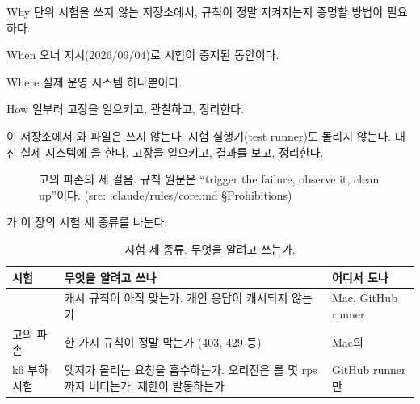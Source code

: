 \begin{inbrief}
  \item[Why] 단위 시험을 쓰지 않는 저장소에서, 규칙이 정말 지켜지는지 증명할 방법이 필요하다.
  \item[When] 오너 지시(2026/09/04)로 시험이 중지된 동안이다.
  \item[Where] 실제 운영 시스템 하나뿐이다.
  \item[How] 일부러 고장을 일으키고, 관찰하고, 정리한다.
\end{inbrief}

이 저장소에서 와  파일은 쓰지 않는다.
시험 실행기(test runner)도 돌리지 않는다.
대신 실제 시스템에 을 한다.
고장을 일으키고, 결과를 보고, 정리한다.

\begin{figure}[H]
  \centering
  \caption{고의 파손의 세 걸음. 규칙 원문은 ``trigger the failure, observe it, clean up''이다.
  (src: .claude/rules/core.md §Prohibitions)}\label{fig:07-breakage-steps}
\end{figure}

가 이 장의 시험 세 종류를 나눈다.

\begin{table}[H]
  \caption{시험 세 종류. 무엇을 알려고 쓰는가.}\label{tab:07-test-kinds}
  \small
  \begin{tabularx}{\linewidth}{L{3.6cm} Y L{3.4cm}}
    \toprule
    시험 & 무엇을 알려고 쓰나 & 어디서 도나 \\
    \midrule
     & 캐시 규칙이 아직 맞는가. 개인 응답이 캐시되지 않는가 & Mac, GitHub runner \\
    \midrule
    고의 파손 & 한 가지 규칙이 정말 막는가 (403, 429 등) & Mac의  \\
    \midrule
    k6 부하 시험 & 엣지가 몰리는 요청을 흡수하는가. 오리진은 를 몇 rps까지 버티는가. 제한이 발동하는가 & GitHub runner만 \\
    \bottomrule
  \end{tabularx}
\end{table}

